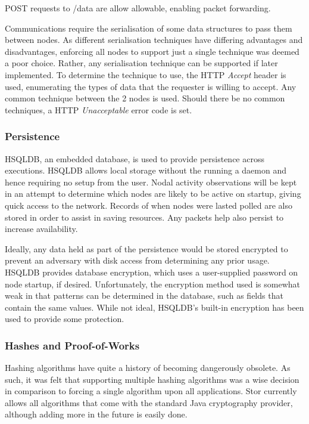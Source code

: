 			POST requests to /data are allow allowable, enabling packet forwarding.
	
			Communications require the serialisation of some data structures to pass them between nodes. As different serialisation techniques have differing advantages and disadvantages, enforcing all nodes to support just a single technique was deemed a poor choice. Rather, any serialisation technique can be supported if later implemented. To determine the technique to use, the HTTP \textit{Accept} header is used, enumerating the types of data that the requester is willing to accept. Any common technique between the 2 nodes is used. Should there be no common techniques, a HTTP \textit{Unacceptable} error code is set.
			
	
		\subsubsection*{Persistence}
			HSQLDB, an embedded database, is used to provide persistence across executions. HSQLDB allows local storage without the running a daemon and hence requiring no setup from the user. Nodal activity observations will be kept in an attempt to determine which nodes are likely to be active on startup, giving quick access to the network. Records of when nodes were lasted polled are also stored in order to assist in saving resources. Any packets help also persist to increase availability.
			
			Ideally, any data held as part of the persistence would be stored encrypted to prevent an adversary with disk access from determining any prior usage. HSQLDB provides database encryption, which uses a user-supplied password on node startup, if desired. Unfortunately, the encryption method used is somewhat weak in that patterns can be determined in the database, such as fields that contain the same values. While not ideal, HSQLDB's built-in encryption has been used to provide some protection.
		\subsubsection*{Hashes and Proof-of-Works}
			Hashing algorithms have quite a history of becoming dangerously obsolete. As such, it was felt that supporting multiple hashing algorithms was a wise decision in comparison to forcing a single algorithm upon all applications. Stor currently allows all algorithms that come with the standard Java cryptography provider, although adding more in the future is easily done. 
		
